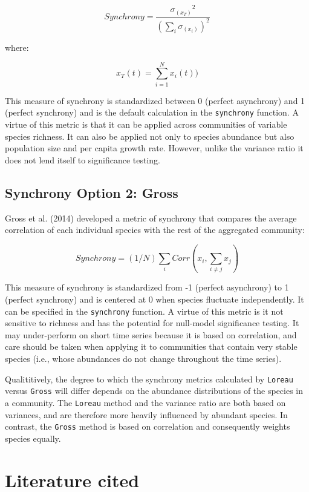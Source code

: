 \documentclass[11pt]{article}
\begin{document}
$$ Synchrony = \frac{{\sigma_(x_T)}^{2}}{({\sum_{i} \sigma_(x_i)})^{2}}$$

where:

$$ x_T(t) = {\sum_{i=1}^{N} x_i(t))} $$

This measure of synchrony is standardized between 0 (perfect asynchrony) and 1 (perfect synchrony) and is the default calculation in the \texttt{synchrony} function. A virtue of this metric is that it can be applied across communities of variable species richness. It can also be applied not only to species abundance but also population size and per capita growth rate. However, unlike the variance ratio it does not lend itself to significance testing. 

\subsection{Synchrony Option 2: Gross}
Gross et al. (2014) developed a metric of synchrony that compares the average correlation of each individual species with the rest of the aggregated community:

$$ Synchrony = (1/N){{\sum_{i}Corr(x_i, \sum_{i\neq{j}}{x_j})}}$$

This measure of synchrony is standardized from -1 (perfect asynchrony) to 1 (perfect synchrony) and is centered at 0 when species fluctuate independently. It can be specified in the \texttt{synchrony} function. A virtue of this metric is it not sensitive to richness and has the potential for null-model significance testing. It may under-perform on short time series because it is based on correlation, and care should be taken when applying it to communities that contain very stable species (i.e., whose abundances do not change throughout the time series).

Qualititively, the degree to which the synchrony metrics calculated by \texttt{Loreau} versus \texttt{Gross} will differ depends on the abundance distributions of the species in a community. The \texttt{Loreau} method and the variance ratio are both based on variances, and are therefore more heavily influenced by abundant species. In contrast,  the \texttt{Gross} method is based on correlation and consequently weights species equally.

\section{Literature cited}


\end{document}
